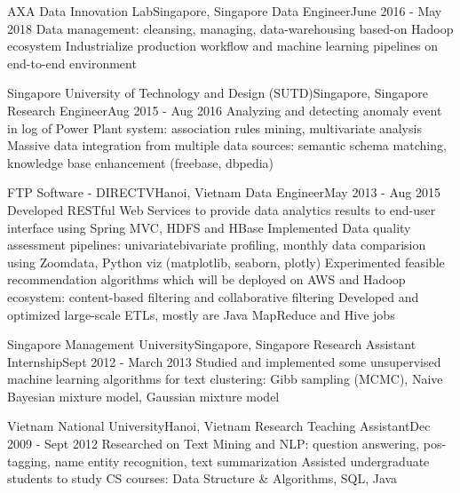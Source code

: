     \resumeSubheading
      {AXA Data Innovation Lab}{Singapore, Singapore}
      {Data Engineer}{June 2016 - May 2018}
      \resumeItemListStart
          {Data management: cleansing, managing, data-warehousing based-on Hadoop ecosystem}
          {Industrialize production workflow and machine learning pipelines on end-to-end environment}
      \resumeItemListEnd
    
    \resumeSubheading
      {Singapore University of Technology and Design (SUTD)}{Singapore, Singapore}
      {Research Engineer}{Aug 2015 - Aug 2016}
      \resumeItemListStart
          {Analyzing and detecting anomaly event in log of Power Plant system: association rules mining, multivariate analysis}
          {Massive data integration from multiple data sources: semantic schema matching, knowledge base enhancement (freebase, dbpedia)}
      \resumeItemListEnd

    \resumeSubheading
      {FTP Software - DIRECTV}{Hanoi, Vietnam}
      {Data Engineer}{May 2013 - Aug 2015}
      \resumeItemListStart
          {Developed RESTful Web Services to provide data analytics results to end-user interface using Spring MVC, HDFS and HBase}
          {Implemented Data quality assessment pipelines: univariate\/bivariate profiling, monthly data comparision using Zoomdata, Python viz (matplotlib, seaborn, plotly)}
          {Experimented feasible recommendation algorithms which will be deployed on AWS and Hadoop ecosystem: content-based filtering and collaborative filtering}
          {Developed and optimized large-scale ETLs, mostly are Java MapReduce and Hive jobs}
      \resumeItemListEnd

    \resumeSubheading
      {Singapore Management University}{Singapore, Singapore}
      {Research Assistant Internship}{Sept 2012 - March 2013}
      \resumeItemListStart
          {Studied and implemented some unsupervised machine learning algorithms for text clustering: Gibb sampling (MCMC), Naive Bayesian mixture model, Gaussian mixture model}
      \resumeItemListEnd

    \resumeSubheading
      {Vietnam National University}{Hanoi, Vietnam}
      {Research Teaching Assistant}{Dec 2009 - Sept 2012}
      \resumeItemListStart
          {Researched on Text Mining and NLP: question answering, pos-tagging, name entity recognition, text summarization}
          {Assisted undergraduate students to study CS courses: Data Structure \& Algorithms, SQL, Java}
      \resumeItemListEnd

  \resumeSubHeadingListEnd